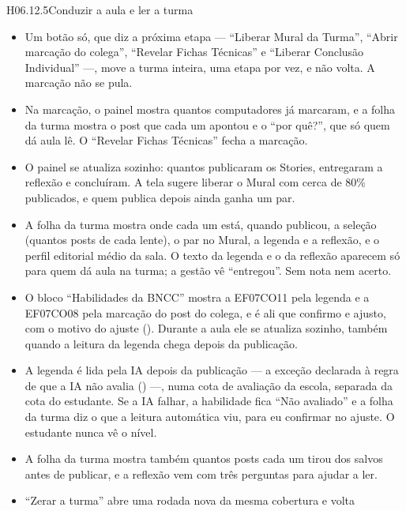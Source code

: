 \begin{historia}{H06.12.5}{Conduzir a aula e ler a turma}{\parcial}
\aceite
\begin{itemize}
  \item Um botão só, que diz a próxima etapa --- \enquote{Liberar Mural da
    Turma}, \enquote{Abrir marcação do colega}, \enquote{Revelar Fichas
    Técnicas} e \enquote{Liberar Conclusão Individual} ---, move a turma
    inteira, uma etapa por vez, e não volta. A marcação não se pula.
  \item Na marcação, o painel mostra quantos computadores já marcaram, e a
    folha da turma mostra o post que cada um apontou e o \enquote{por quê?},
    que só quem dá aula lê. O \enquote{Revelar Fichas Técnicas} fecha a
    marcação.
  \item O painel se atualiza sozinho: quantos publicaram os Stories,
    entregaram a reflexão e concluíram. A tela sugere liberar o Mural com cerca
    de 80\% publicados, e quem publica depois ainda ganha um par.
  \item A folha da turma mostra onde cada um está, quando publicou, a seleção
    (quantos posts de cada lente), o par no Mural, a legenda e a reflexão, e o
    perfil editorial médio da sala. O texto da legenda e o da reflexão aparecem
    só para quem dá aula na turma; a gestão vê \enquote{entregou}. Sem nota nem
    acerto.
  \item O bloco \enquote{Habilidades da BNCC} mostra a EF07CO11 pela legenda e
    a EF07CO08 pela marcação do post do colega, e é ali que confirmo e ajusto,
    com o motivo do ajuste (). Durante a aula ele se atualiza sozinho,
    também quando a leitura da legenda chega depois da publicação.
  \item A legenda é lida pela IA depois da publicação --- a exceção declarada à
    regra de que a IA não avalia () ---, numa cota de avaliação
    da escola, separada da cota do estudante. Se a IA falhar, a habilidade
    fica \enquote{Não avaliado} e a folha da turma diz o que a leitura
    automática viu, para eu confirmar no ajuste. O estudante nunca vê o nível.
  \item A folha da turma mostra também quantos posts cada um tirou dos salvos
    antes de publicar, e a reflexão vem com três perguntas para ajudar a ler.
  \item \enquote{Zerar a turma} abre uma rodada nova da mesma cobertura e volta

\end{itemize}
\end{historia}
